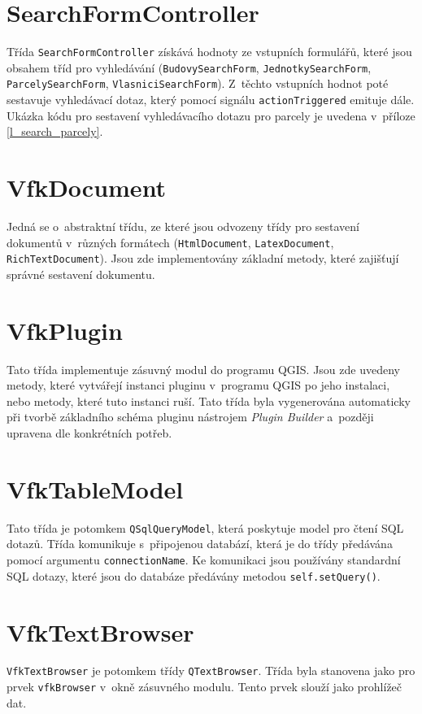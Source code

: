 \documentclass[a4paper,12pt,oneside]{book}
\begin{document}
\section*{SearchFormController}
Třída \texttt{SearchFormController} získává hodnoty ze vstupních
formulářů, které jsou obsahem tříd pro vyhledávání
(\texttt{BudovySearchForm}, \texttt{JednotkySearchForm},
\texttt{Par\-celySearchForm}, \texttt{VlasniciSearchForm}). Z~těchto
vstupních hodnot poté sestavuje vyhledávací dotaz, který pomocí
signálu \texttt{actionTriggered} emituje dále. Ukázka kódu pro
sestavení vyhledávacího dotazu pro parcely je uvedena v~příloze
\ref{l_search_parcely}.

\section*{VfkDocument}
\label{l_vfkDocument}
Jedná se o~abstraktní třídu, ze které jsou odvozeny třídy pro
sestavení dokumentů v~různých formátech (\texttt{HtmlDocument},
\texttt{LatexDocument}, \texttt{RichTextDocument}). Jsou zde
implementovány základní metody, které zajišťují správné sestavení
dokumentu.

\section*{VfkPlugin}
Tato třída implementuje zásuvný modul do programu QGIS. Jsou zde
uvedeny metody, které vytvářejí instanci pluginu v~programu QGIS po
jeho instalaci, nebo metody, které tuto instanci ruší. Tato třída byla
vygenerována automaticky při tvorbě základního schéma pluginu
nástrojem \textit{Plugin Builder} a~později upravena dle konkrétních
potřeb.

\section*{VfkTableModel}
Tato třída je potomkem \texttt{QSqlQueryModel}, která poskytuje
model pro čtení SQL dotazů. Třída komunikuje s~připojenou databází,
která je do třídy předávána pomocí argumentu
\texttt{connectionName}. Ke komunikaci jsou používány standardní SQL
dotazy, které jsou do databáze předávány metodou
\texttt{self.setQuery()}.

\section*{VfkTextBrowser}
\texttt{VfkTextBrowser} je potomkem třídy \texttt{QTextBrowser}. Třída
byla stanovena jako  pro prvek \texttt{vfkBrowser} v~okně
zásuvného modulu. Tento prvek slouží jako prohlížeč dat.
\end{document}
